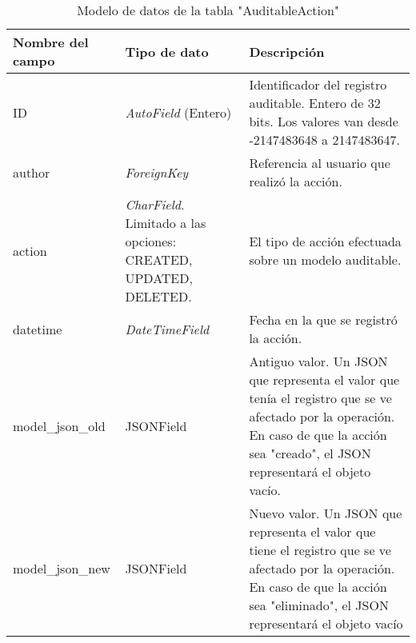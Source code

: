 \begin{table}[h]
\centering
\caption{Modelo de datos de la tabla "AuditableAction"}
\label{tabla:1.3}
\begin{tabular}{| p{} | p{} | p{} |}
\hline
\textbf{Nombre del campo} & \textbf{Tipo de dato}                               & \textbf{Descripción}                                                                                                                                                                   \\ \hline
ID                        & \textit{AutoField} (Entero)                                        & Identificador del registro auditable. Entero de 32 bits. Los valores van desde -2147483648 a 2147483647.                      \\ \hline
author                    & \textit{ForeignKey}                                         & Referencia al usuario que realizó la acción.                                                                                                                                           \\ \hline
action                    & \textit{CharField}. Limitado a las opciones: CREATED,
UPDATED, DELETED. & El tipo de acción efectuada sobre un modelo auditable.                                                                                                                                 \\ \hline
datetime            & \textit{DateTimeField} & Fecha en la que se registró la acción.\\ \hline
model\_json\_old          & JSONField                                          & Antiguo valor. Un JSON que representa el valor que tenía el registro que se ve afectado por la operación. En caso de que la acción sea "creado", el JSON representará el objeto vacío. \\ \hline
model\_json\_new          & JSONField                                           & Nuevo valor. Un JSON que representa el valor que tiene el registro que se ve afectado por la operación. En caso de que la acción sea "eliminado", el JSON representará el objeto vacío \\ \hline
\end{tabular}

\end{table}
